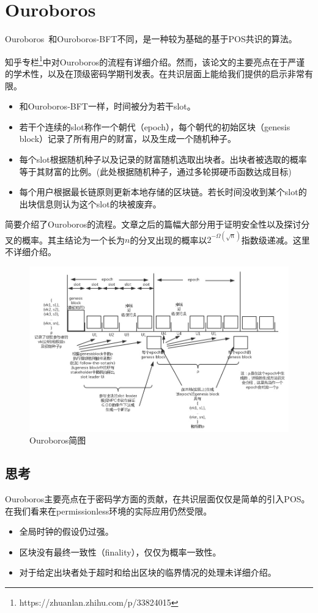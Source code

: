 \section{Ouroboros}
Ouroboros~\cite{kiayias2017ouroboros}和Ouroboros-BFT不同，是一种较为基础的基于POS共识的算法。

知乎专栏\footnote{https://zhuanlan.zhihu.com/p/33824015}中对Ouroboros的流程有详细介绍。然而，该论文的主要亮点在于严谨的学术性，以及在顶级密码学期刊发表。在共识层面上能给我们提供的启示非常有限。

\begin{itemize}
	\item 和Ouroboros-BFT一样，时间被分为若干slot。
	\item 若干个连续的slot称作一个朝代（epoch），每个朝代的初始区块（genesis block）记录了所有用户的财富，以及生成一个随机种子。
	\item 每个slot根据随机种子以及记录的财富随机选取出块者。出块者被选取的概率等于其财富的比例。(此处根据随机种子，通过多轮掷硬币函数达成目标)
	\item 每个用户根据最长链原则更新本地存储的区块链。若长时间没收到某个slot的出块信息则认为这个slot的块被废弃。
\end{itemize}
简要介绍了Ouroboros的流程。文章之后的篇幅大部分用于证明安全性以及探讨分叉的概率。其主结论为一个长为$n$的分叉出现的概率以$2^{-\Omega(\sqrt{n})}$指数级递减。这里不详细介绍。
\begin{figure}
	\centering
	\includegraphics[width=1\textwidth]{../common/Ouroboros.png}
	\caption{Ouroboros简图} 
	\label{fig:Ouroboros2}
\end{figure}
\subsection{思考}
Ouroboros主要亮点在于密码学方面的贡献，在共识层面仅仅是简单的引入POS。在我们看来在permissionless环境的实际应用仍然受限。
\begin{itemize}
	\item 全局时钟的假设仍过强。
	\item 区块没有最终一致性（finality），仅仅为概率一致性。
	\item 对于给定出块者处于超时和给出区块的临界情况的处理未详细介绍。
\end{itemize}
	